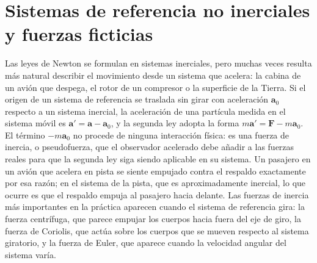 \documentclass[10pt,openany]{book}
\begin{document}

\section{Sistemas de referencia no inerciales y fuerzas ficticias}

Las leyes de Newton se formulan en sistemas inerciales, pero muchas veces resulta más natural describir el movimiento desde un sistema que acelera: la cabina de un avión que despega, el rotor de un compresor o la superficie de la Tierra. Si el origen de un sistema de referencia se traslada sin girar con aceleración \(\mathbf{a}_0\) respecto a un sistema inercial, la aceleración de una partícula medida en el sistema móvil es \(\mathbf{a}' = \mathbf{a} - \mathbf{a}_0\), y la segunda ley adopta la forma \(m\mathbf{a}' = \mathbf{F} - m\mathbf{a}_0\). El término \(-m\mathbf{a}_0\) no procede de ninguna interacción física: es una fuerza de inercia, o pseudofuerza, que el observador acelerado debe añadir a las fuerzas reales para que la segunda ley siga siendo aplicable en su sistema. Un pasajero en un avión que acelera en pista se siente empujado contra el respaldo exactamente por esa razón; en el sistema de la pista, que es aproximadamente inercial, lo que ocurre es que el respaldo empuja al pasajero hacia delante. Las fuerzas de inercia más importantes en la práctica aparecen cuando el sistema de referencia gira: la fuerza centrífuga, que parece empujar los cuerpos hacia fuera del eje de giro, la fuerza de Coriolis, que actúa sobre los cuerpos que se mueven respecto al sistema giratorio, y la fuerza de Euler, que aparece cuando la velocidad angular del sistema varía.
\end{document}
